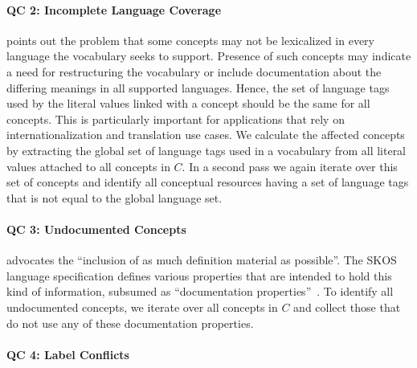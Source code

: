 
\paragraph{QC 2: Incomplete Language Coverage}
\cite{Soergel1997} points out the problem that some concepts may not be lexicalized in every language the vocabulary seeks to support. Presence of such concepts may indicate a need for restructuring the vocabulary or include documentation about the differing meanings in all supported languages. Hence, the set of language tags used by the literal values linked with a concept should be the same for all concepts. This is particularly important for applications that rely on internationalization and translation use cases. We calculate the affected concepts by extracting the global set of language tags used in a vocabulary from all literal values attached to all concepts in $C$. In a second pass we again iterate over this set of concepts and identify all conceptual resources having a set of language tags that is not equal to the global language set.

\paragraph{QC 3: Undocumented Concepts}

\cite{Svenonius1997} advocates the ``inclusion of as much definition material as possible''. The SKOS language specification defines various properties that are intended to hold this kind of information, subsumed as ``documentation properties''~\cite{SkosReference2008}. To identify all undocumented concepts, we iterate over all concepts in $C$ and collect those that do not use any of these documentation properties.

\paragraph{QC 4: Label Conflicts}


